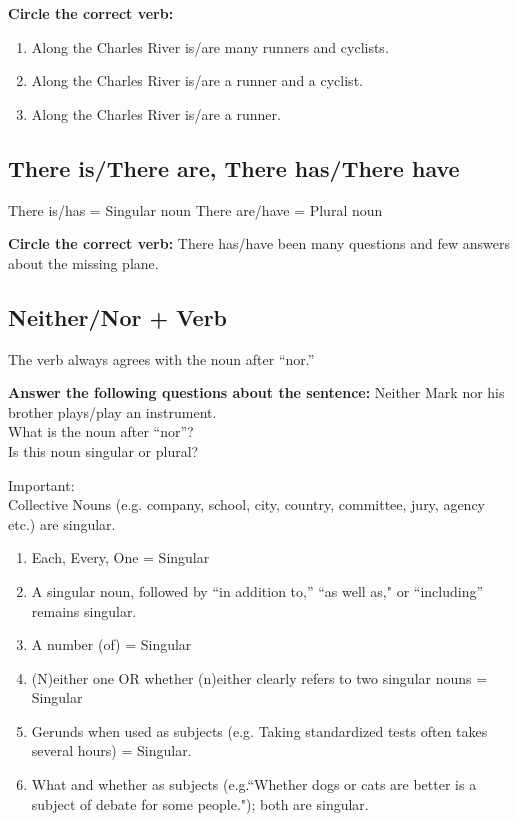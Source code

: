 \bigskip
\textbf{Circle the correct verb:}
\begin{enumerate}\itemsep-0.4em
\item{Along the Charles River is/are many runners and cyclists.}
\item{Along the Charles River is/are a runner and a cyclist.}
\item{Along the Charles River is/are a runner.}
\end{enumerate}

\subsection{There is/There are, There has/There have}
There is/has = Singular noun
There are/have = Plural noun

\bigskip
\textbf{Circle the correct verb:} 
There has/have been many questions and few answers about the missing plane.

\subsection{Neither/Nor + Verb}
The verb always agrees with the noun after ``nor.''

\bigskip
\textbf{Answer the following questions about the sentence:}
Neither Mark nor his brother plays/play an instrument.\\
What is the noun after ``nor''? \hrulefill \\
Is this noun singular or plural? \hrulefill

\bigskip
Important:\\
Collective Nouns (e.g. company, school, city, country, committee, jury, agency etc.) are singular.

\begin{enumerate}
\item{Each, Every, One = Singular}
\item{A singular noun, followed by ``in addition to,'' ``as well as," or ``including''} remains singular.
\item{A number (of) = Singular}
\item{(N)either one OR whether (n)either clearly refers to two singular nouns = Singular}
\item{Gerunds when used as subjects (e.g. Taking standardized tests often takes several hours) = Singular.}
\item{What and whether as subjects (e.g.``Whether dogs or cats are better is a subject of debate for some people."); both are singular.}
\end{enumerate}

